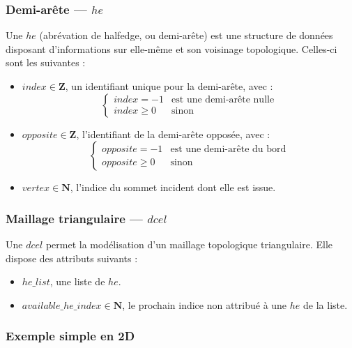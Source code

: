 \documentclass[]{article}
\begin{document}
\begin{multicols}{2}
\subsubsection{Demi-arête — $he$}
Une $he$ (abrévation de halfedge, ou demi-arête) est une structure de données disposant d'informations sur elle-même et son voisinage topologique. Celles-ci sont les suivantes :
\begin{itemize}
	\item $index \in \mathbf{Z}$, un identifiant unique pour la demi-arête, avec :
		\[
			\left\{
				\begin{array}{ll}
					index = -1		& \mbox{est une demi-arête nulle} \\
					index \geq 0 	& \mbox{sinon}
				\end{array}
			\right.
		\]
	\item $opposite \in \mathbf{Z}$, l'identifiant de la demi-arête opposée, avec :
		\[
			\left\{
				\begin{array}{ll}
					opposite = -1 		& \text{est une demi-arête du bord} \\
					opposite \geq 0 	& \text{sinon}
				\end{array}
			\right.
		\]
	\item $vertex \in \mathbf{N}$, l'indice du sommet incident dont elle est issue.
\end{itemize}

\subsubsection{Maillage triangulaire — $dcel$}
Une $dcel$ permet la modélisation d'un maillage topologique triangulaire. Elle dispose des attributs suivants :
\begin{itemize}
	\item $he\_list$, une liste de $he$.
	\item $available\_he\_index \in \mathbf{N}$, le prochain indice non attribué à une $he$ de la liste.
\end{itemize}

\subsubsection{Exemple simple en 2D}


\end{multicols}
\end{document}

